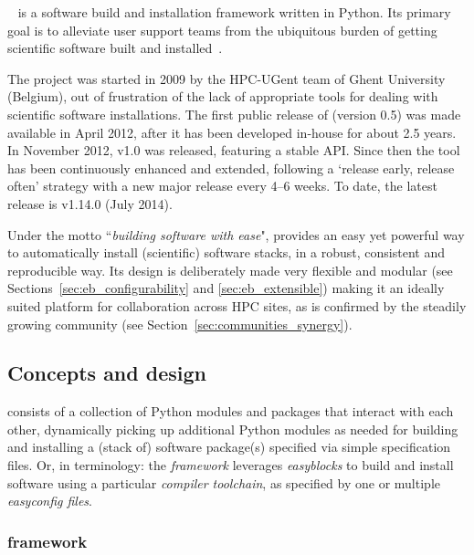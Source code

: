 \easybuild{}~\cite{EasyBuildSC12} is a software build and installation framework
written in Python. Its primary goal is to alleviate user support teams from the
ubiquitous burden of getting scientific software built and installed~\cite{Dubois03}.

The \easybuild{} project was started in 2009 by the HPC-UGent team of Ghent
University (Belgium), out of frustration of the lack of appropriate tools for dealing
with scientific software installations. The first public release of \easybuild{} (version 0.5) was made available in April 2012, after it has been developed in-house for 
about 2.5 years. In November 2012, \easybuild{} v1.0 was released, featuring
a stable API. Since then the tool has been continuously enhanced and extended,
following a `release early, release often' strategy with a new major release every
4--6 weeks. To date, the latest release is \easybuild{} v1.14.0 (July 2014).

Under the motto ``\emph{building software with ease}", \easybuild{} provides an easy
yet powerful way to automatically install (scientific) software stacks, in a robust,
consistent and reproducible way. Its design is deliberately made very flexible and
modular (see Sections~\ref{sec:eb_configurability} and \ref{sec:eb_extensible})
making it an ideally suited platform for collaboration across HPC sites, as is
confirmed by the steadily growing \easybuild{} community (see
Section~\ref{sec:communities_synergy}).

\subsection{Concepts and design}

\easybuild{} consists of a collection of Python modules and packages that
interact with each other, dynamically picking up additional Python modules as needed
for building and installing a (stack of) software package(s) specified via simple
specification files. Or, in \easybuild{} terminology: the \easybuild{}
\emph{framework} leverages \emph{easyblocks} to build and install software using
a particular \emph{compiler toolchain}, as specified by one or multiple
\emph{easyconfig files}.

\subsubsection{\easybuild{} framework}
\label{sec:eb_framework}

